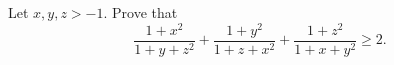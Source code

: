 Let $x, y, z > -1$. Prove that \[\frac{1+x^2}{1+y+z^2} + \frac{1+y^2}{1+z+x^2} + \frac{1+z^2}{1+x+y^2} \geq 2.\]
